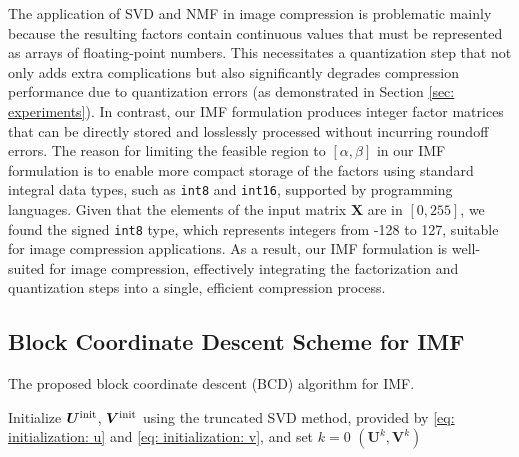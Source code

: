 The application of SVD and NMF in image compression is problematic mainly because the resulting factors contain continuous values that must be represented as arrays of floating-point numbers. This necessitates a quantization step that not only adds extra complications but also significantly degrades compression performance due to quantization errors (as demonstrated in Section \ref{sec: experiments}). In contrast, our IMF formulation produces integer factor matrices that can be directly stored and losslessly processed without incurring roundoff errors. The reason for limiting the feasible region to $[\alpha,\beta]$ in our IMF formulation is to enable more compact storage of the factors using standard integral data types, such as \texttt{int8} and \texttt{int16}, supported by programming languages. Given that the elements of the input matrix $\bm{X}$ are in $[0, 255]$, we found the signed \texttt{int8} type, which represents integers from -128 to 127, suitable for image compression applications. As a result, our IMF formulation is well-suited for image compression, effectively integrating the factorization and quantization steps into a single, efficient compression process.


\subsection{Block Coordinate Descent Scheme for IMF} \label{sec: bcd}

\begin{algorithm}[!t]
	\caption{The proposed block coordinate descent (BCD) algorithm for IMF. \label{alg: bcd for imf}}
	\DontPrintSemicolon
	\SetAlgoLined
	Initialize $\bm{U}^{\rm init}$, $\bm{V}^{\rm init}$ using the truncated SVD method, provided by \eqref{eq: initialization: u} and \eqref{eq: initialization: v}, and set $k=0$\;
	\Return $(\bm{U}^k, \bm{V}^k)$
\end{algorithm}

